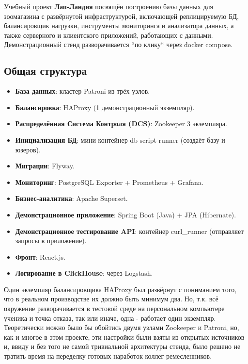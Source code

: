 Учебный проект \textbf{Лап-Ландия} посвящён построению базы данных для зоомагазина с развёрнутой инфраструктурой,
включающей реплицируемую БД, балансировщик нагрузки,
инструменты мониторинга и анализатора данных, а также
серверного и клиентского приложений, работающих с данными.
Демонстрационный стенд разворачивается ``по клику`` через docker compose.

\subsection{Общая структура}\label{subsec:generalstructure}

\begin{itemize}
    \item \textbf{База данных}: кластер Patroni из трёх узлов.
    \item \textbf{Балансировка}: HAProxy (1 демонстрационный экземпляр).
    \item \textbf{Распределённая Система Контроля (DCS)}: Zookeeper 3 экземпляра.
    \item \textbf{Инициализация БД}: мини-контейнер db-script-runner (создаёт базу и юзеров).
    \item \textbf{Миграции}: Flyway.
    \item \textbf{Мониторинг}: PostgreSQL Exporter + Prometheus + Grafana.
    \item \textbf{Бизнес-аналитика}: Apache Superset.
    \item \textbf{Демонстрационное приложение}: Spring Boot (Java) + JPA (Hibernate).
    \item \textbf{Демонстрационное тестирование API}: контейнер curl\_runner (отправляет запросы в приложение).
    \item \textbf{Фронт}: React.js.
    \item \textbf{Логирование в ClickHouse}: через Logstash.
\end{itemize}

Один экземпляр балансировщика HAProxy был развёрнут с пониманием того, что в реальном производстве их должно быть
минимум два.
Но, т.к. всё окружение разворачивается в тестовой среде на персональном компьютере ученика и точка отказа, так или
иначе, одна - работает один экземпляр.
Теоретически можно было бы обойтись двумя узлами Zookeeper и Patroni, но, как и многое в этом проекте, эти настройки
были взяты из открытых источников и, ввиду и без того не самой тривиальной архитектуры стенда, было решено
не тратить время на переделку готовых наработок коллег-ремесленников.

